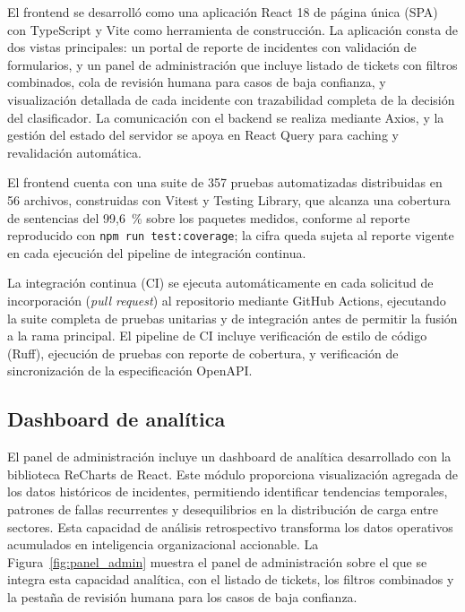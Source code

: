 El frontend se desarrolló como una aplicación React 18 de página única (SPA) con TypeScript y Vite como herramienta de construcción. La aplicación consta de dos vistas principales: un portal de reporte de incidentes con validación de formularios, y un panel de administración que incluye listado de tickets con filtros combinados, cola de revisión humana para casos de baja confianza, y visualización detallada de cada incidente con trazabilidad completa de la decisión del clasificador. La comunicación con el backend se realiza mediante Axios, y la gestión del estado del servidor se apoya en React Query para caching y revalidación automática.

El frontend cuenta con una suite de 357 pruebas automatizadas distribuidas en 56 archivos, construidas con Vitest y Testing Library, que alcanza una cobertura de sentencias del 99,6~\% sobre los paquetes medidos, conforme al reporte reproducido con \texttt{npm run test:coverage}; la cifra queda sujeta al reporte vigente en cada ejecución del pipeline de integración continua.

La integración continua (CI) se ejecuta automáticamente en cada solicitud de incorporación (\emph{pull request}) al repositorio mediante GitHub Actions, ejecutando la suite completa de pruebas unitarias y de integración antes de permitir la fusión a la rama principal. El pipeline de CI incluye verificación de estilo de código (Ruff), ejecución de pruebas con reporte de cobertura, y verificación de sincronización de la especificación OpenAPI.

\subsection{Dashboard de analítica}\label{subsec:dashboard-analitica}

El panel de administración incluye un dashboard de analítica desarrollado con la biblioteca ReCharts de React. Este módulo proporciona visualización agregada de los datos históricos de incidentes, permitiendo identificar tendencias temporales, patrones de fallas recurrentes y desequilibrios en la distribución de carga entre sectores. Esta capacidad de análisis retrospectivo transforma los datos operativos acumulados en inteligencia organizacional accionable. La Figura~\ref{fig:panel_admin} muestra el panel de administración sobre el que se integra esta capacidad analítica, con el listado de tickets, los filtros combinados y la pestaña de revisión humana para los casos de baja confianza.

